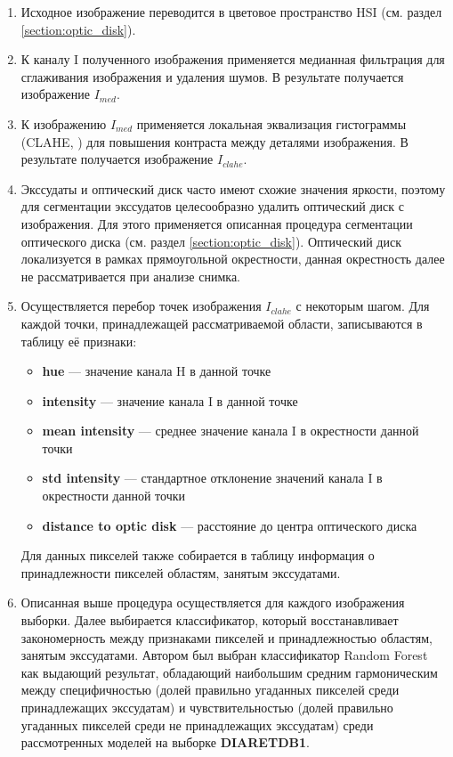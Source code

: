 \documentclass[12pt,fleqn]{article}
\begin{document}
\begin{enumerate}
	\item Исходное изображение переводится в цветовое пространство HSI (см. раздел \ref{section:optic_disk}).
	\item К каналу I полученного изображения применяется медианная фильтрация для сглаживания изображения и удаления шумов. В результате получается изображение $I_{med}$.
	\item К изображению $I_{med}$ применяется локальная эквализация гистограммы (CLAHE, \cite[стр. 110]{szeliski}) для повышения контраста между деталями изображения. В результате получается изображение $I_{clahe}$.
	\item Экссудаты и оптический диск часто имеют схожие значения яркости, поэтому для сегментации экссудатов целесообразно удалить оптический диск с изображения. Для этого применяется описанная процедура сегментации оптического диска (см. раздел \ref{section:optic_disk}). Оптический диск локализуется в рамках прямоугольной окрестности, данная окрестность далее не рассматривается при анализе снимка.
	\item Осуществляется перебор точек изображения $I_{clahe}$ с некоторым шагом. Для каждой точки, принадлежащей рассматриваемой области, записываются в таблицу её признаки:
	\begin{itemize}
		\item \textbf{hue} --- значение канала H в данной точке
		\item \textbf{intensity} --- значение канала I в данной точке
		\item \textbf{mean intensity} --- среднее значение канала I в окрестности данной точки
		\item \textbf{std intensity} --- стандартное отклонение значений канала I в окрестности данной точки
		\item \textbf{distance to optic disk} --- расстояние до центра оптического диска
	\end{itemize}
	Для данных пикселей также собирается в таблицу информация о принадлежности пикселей областям, занятым экссудатами.
	\item Описанная выше процедура осуществляется для каждого изображения выборки. Далее выбирается классификатор, который восстанавливает закономерность между признаками пикселей и принадлежностью областям, занятым экссудатами. Автором был выбран классификатор Random Forest как выдающий результат, обладающий наибольшим средним гармоническим между специфичностью (долей правильно угаданных пикселей среди принадлежащих экссудатам) и чувствительностью (долей правильно угаданных пикселей среди не принадлежащих экссудатам) среди рассмотренных моделей на выборке \textbf{DIARETDB1}.
	
\end{enumerate}
\end{document}
